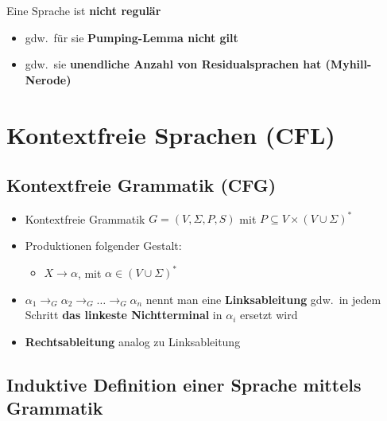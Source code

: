 \documentclass[ieeetran]{article}
\begin{document}
\pagebreak

\hspace{-0.65cm} Eine Sprache ist \textbf{nicht regulär}
\begin{itemize}
	\item gdw.\ für sie \textbf{Pumping-Lemma nicht gilt}
	\item gdw.\ sie \textbf{unendliche Anzahl von Residualsprachen hat (Myhill-Nerode)}
\end{itemize}
\section{Kontextfreie Sprachen (CFL)} %
\label{sec:kontextfreie_sprachen}

\subsection{Kontextfreie Grammatik (CFG)} %
\label{sub:kontextfreie_grammatik_cFG}
\begin{itemize}
	\item Kontextfreie Grammatik $G = (V, \Sigma, P, S)$ mit $P \subseteq V \times (V \cup \Sigma)^*$
  \item Produktionen folgender Gestalt:
\begin{itemize}
  \item $X \rightarrow \alpha$, mit $\alpha \in (V \cup \Sigma)^*$
\end{itemize}

\item $\alpha_1 \rightarrow_G \alpha_2 \rightarrow_G \ldots \rightarrow_G \alpha_n$ nennt man eine \textbf{Linksableitung} gdw.\ in jedem Schritt \textbf{das linkeste Nichtterminal} in $\alpha_i$ ersetzt wird
\item \textbf{Rechtsableitung} analog zu Linksableitung
\end{itemize}

\subsection{Induktive Definition einer Sprache mittels Grammatik} %
\label{sub:induktive_definition}
\end{document}
